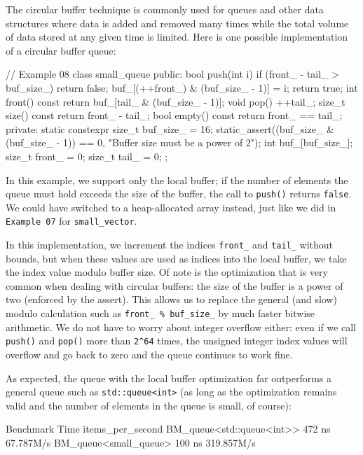 The circular buffer technique is commonly used for queues and other data structures where data is added and removed many times while the total volume of data stored at any given time is limited. Here is one possible implementation of a circular buffer queue:

\begin{code}
// Example 08
class small_queue {
  public:
  bool push(int i) {
    if (front_ - tail_ > buf_size_) return false;
    buf_[(++front_) & (buf_size_ - 1)] = i;
    return true;
  }
  int front() const {
    return buf_[tail_ & (buf_size_ - 1)];
  }
  void pop() { ++tail_; }
  size_t size() const { return front_ - tail_; }
  bool empty() const { return front_ == tail_; }
  private:
  static constexpr size_t buf_size_ = 16;
  static_assert((buf_size_ & (buf_size_ - 1)) == 0,
                "Buffer size must be a power of 2");
  int buf_[buf_size_];
  size_t front_ = 0;
  size_t tail_ = 0;
};
\end{code}

In this example, we support only the local buffer; if the number of elements the queue must hold exceeds the size of the buffer, the call to \texttt{push()} returns \texttt{false}. We could have switched to a heap-allocated array instead, just like we did in \texttt{Example\ 07} for \texttt{small\_vector}.

In this implementation, we increment the indices \texttt{front\_} and \texttt{tail\_} without bounds, but when these values are used as indices into the local buffer, we take the index value modulo buffer size. Of note is the optimization that is very common when dealing with circular buffers: the size of the buffer is a power of two (enforced by the assert). This allows us to replace the general (and slow) modulo calculation such as \texttt{front\_\ \%\ buf\_size\_} by much faster bitwise arithmetic. We do not have to worry about integer overflow either: even if we call \texttt{push()} and \texttt{pop()} more than \texttt{2\^{}64} times, the unsigned integer index values will overflow and go back to zero and the queue continues to work fine.

As expected, the queue with the local buffer optimization far outperforms a general queue such as \texttt{std::queue\textless{}int\textgreater{}} (as long as the optimization remains valid and the number of elements in the queue is small, of course):

\begin{code}
Benchmark                         Time   items_per_second
BM_queue<std::queue<int>>       472 ns          67.787M/s
BM_queue<small_queue>           100 ns         319.857M/s
\end{code}

